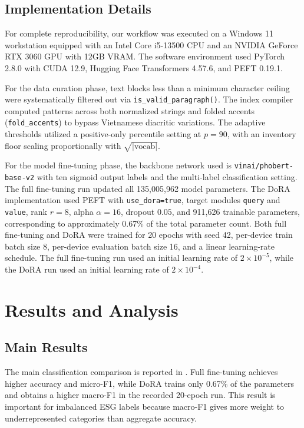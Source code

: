 \documentclass{article}
\theoremstyle{plain}
\theoremstyle{definition}
\theoremstyle{remark}
\begin{document}
\subsection{Implementation Details}
For complete reproducibility, our workflow was executed on a Windows 11 workstation equipped with an Intel Core i5-13500 CPU and an NVIDIA GeForce RTX 3060 GPU with 12GB VRAM. The software environment used PyTorch 2.8.0 with CUDA 12.9, Hugging Face Transformers 4.57.6, and PEFT 0.19.1.

For the data curation phase, text blocks less than a minimum character ceiling were systematically filtered out via \texttt{is\_valid\_paragraph()}. The index compiler computed patterns across both normalized strings and folded accents (\texttt{fold\_accents}) to bypass Vietnamese diacritic variations. The adaptive thresholds utilized a positive-only percentile setting at $p=90$, with an inventory floor scaling proportionally with $\sqrt{|\text{vocab}|}$.

For the model fine-tuning phase, the backbone network used is \texttt{vinai/phobert-base-v2} with ten sigmoid output labels and the multi-label classification setting. The full fine-tuning run updated all 135,005,962 model parameters. The DoRA implementation used PEFT with \texttt{use\_dora=true}, target modules \texttt{query} and \texttt{value}, rank $r=8$, alpha $\alpha=16$, dropout $0.05$, and 911,626 trainable parameters, corresponding to approximately 0.67\% of the total parameter count. Both full fine-tuning and DoRA were trained for 20 epochs with seed 42, per-device train batch size 8, per-device evaluation batch size 16, and a linear learning-rate schedule. The full fine-tuning run used an initial learning rate of $2\times 10^{-5}$, while the DoRA run used an initial learning rate of $2\times 10^{-4}$.



\section{Results and Analysis}
\label{sec:results}

\subsection{Main Results}
The main classification comparison is reported in . Full fine-tuning achieves higher accuracy and micro-F1, while DoRA trains only 0.67\% of the parameters and obtains a higher macro-F1 in the recorded 20-epoch run. This result is important for imbalanced ESG labels because macro-F1 gives more weight to underrepresented categories than aggregate accuracy.
\end{document}
